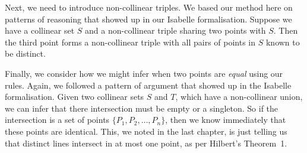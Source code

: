 Next, we need to introduce non-collinear triples. We based our method here on patterns of reasoning that showed up in our Isabelle formalisation. Suppose we have a collinear set $S$ and a non-collinear triple sharing two points with $S$. Then the third point forms a non-collinear triple with all pairs of points in $S$ known to be distinct.

Finally, we consider how we might infer when two points are \emph{equal} using our rules. Again, we followed a pattern of argument that showed up in the Isabelle formalisation. Given two collinear sets $S$ and $T$, which have a non-collinear union, we can infer that there intersection must be empty or a singleton. So if the intersection is a set of points $\{P_1,P_2,\ldots,P_n\}$, then we know immediately that these points are identical. This, we noted in the last chapter, is just telling us that distinct lines intersect in at most one point, as per Hilbert's Theorem~1.

